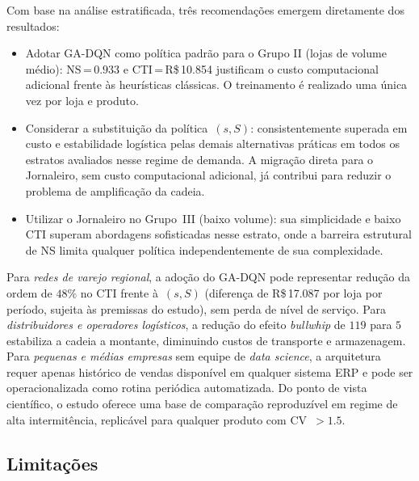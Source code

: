 \documentclass[a4paper,11pt]{article}
\begin{document}
Com base na análise estratificada, três recomendações emergem
diretamente dos resultados:

\begin{itemize}
  \item Adotar GA-DQN como política padrão para o Grupo II
    (lojas de volume médio): NS\,=\,$0.933$ e
    CTI\,=\,R\$\,10.854 justificam o custo computacional adicional
    frente às heurísticas clássicas. O treinamento é realizado uma
    única vez por loja e produto.
  \item Considerar a substituição da política~$(s,S)$:
    consistentemente superada em custo e estabilidade logística
    pelas demais alternativas práticas em todos os estratos
    avaliados nesse regime de demanda. A migração
    direta para o Jornaleiro, sem custo computacional adicional,
    já contribui para reduzir o problema de amplificação da cadeia.
  \item Utilizar o Jornaleiro no Grupo~III (baixo volume): sua
    simplicidade e baixo CTI superam abordagens sofisticadas nesse
    estrato, onde a barreira estrutural de NS limita qualquer
    política independentemente de sua complexidade.
\end{itemize}

Para \emph{redes de varejo regional}, a adoção do GA-DQN pode
representar redução da ordem de $48\%$ no CTI frente à~$(s,S)$
(diferença de R\$\,17.087 por loja por período, sujeita às premissas
do estudo), sem perda de nível de serviço.
Para \emph{distribuidores e operadores logísticos}, a redução do
efeito \textit{bullwhip} de $119$ para $5$ estabiliza a cadeia a
montante, diminuindo custos de transporte e armazenagem.
Para \emph{pequenas e médias empresas} sem equipe de
\textit{data science}, a arquitetura requer apenas histórico de
vendas disponível em qualquer sistema ERP e pode ser
operacionalizada como rotina periódica automatizada.
Do ponto de vista científico, o estudo oferece uma base de
comparação reproduzível em regime de alta intermitência,
replicável para qualquer produto com CV~$>1.5$.

\subsection{Limitações}
\end{document}
